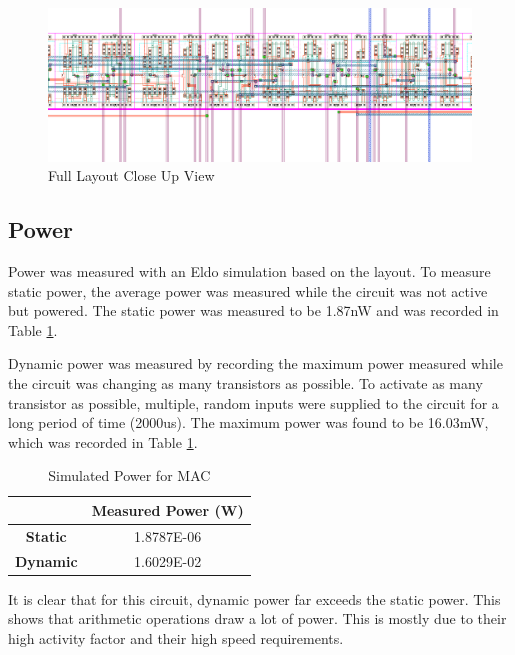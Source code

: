 \documentclass[11pt]{article}
\begin{document}
		\begin{figure}[H] 
			\centering 
			\includegraphics[width=\textwidth,height=\dimexpr\textheight-4\baselineskip-\abovecaptionskip-\belowcaptionskip\relax,keepaspectratio]{"Pictures/Full Layout Close Up View"}
			\caption{Full Layout Close Up View} 
			\label{fig:Full-Layout-Close-Up-View} 
		\end{figure}
	
	\subsection{Power}
		Power was measured with an Eldo simulation based on the layout. To measure static power, the average power was measured while the circuit was not active but powered. The static power was measured to be 1.87nW and was recorded in Table \ref{tab:power}. 
		
		Dynamic power was measured by recording the maximum power measured while the circuit was changing as many transistors as possible. To activate as many transistor as possible, multiple, random inputs were supplied to the circuit for a long period of time (2000us). The maximum power was found to be 16.03mW, which was recorded in Table \ref{tab:power}.
		
		
		
		\begin{table}[H]
			\centering
			\caption{Simulated Power for MAC}
			\label{tab:power}
			\begin{tabular}{|cc|}
				\hline
				\textbf{}        & \textbf{Measured Power (W)} \\
				\hline
				\textbf{Static}  & 1.8787E-06           \\
				\textbf{Dynamic} & 1.6029E-02           \\ 
				\hline                     
			\end{tabular}
		\end{table}
	
		It is clear that for this circuit, dynamic power far exceeds the static power. This shows that arithmetic operations draw a lot of power. This is mostly due to their high activity factor and their high speed requirements.  
\end{document}

